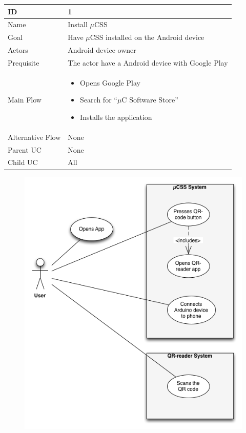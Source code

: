     \begin{table}
        \begin{tabular}{|l|l|}
            \hline
            ID               & 1 \\ \hline
            Name             & Install $\mu$CSS\\
            Goal             & Have $\mu$CSS installed on the Android device\\
            Actors           & Android device owner\\
            Prequisite       & The actor have a Android device with Google Play\\
            Main Flow        & \begin{itemize}
                                \item{Opens Google Play} 
                                \item{Search for ``$\mu$C Software Store''} 
                                \item{Installs the application}
                                \end{itemize} \\
            Alternative Flow & None\\
            Parent UC        & None\\
            Child UC         & All\\
            \hline
        \end{tabular}
    \end{table}

\begin{figure}[H]
\centering
\includegraphics[scale=1]{images/UseCase2}
\end{figure}

